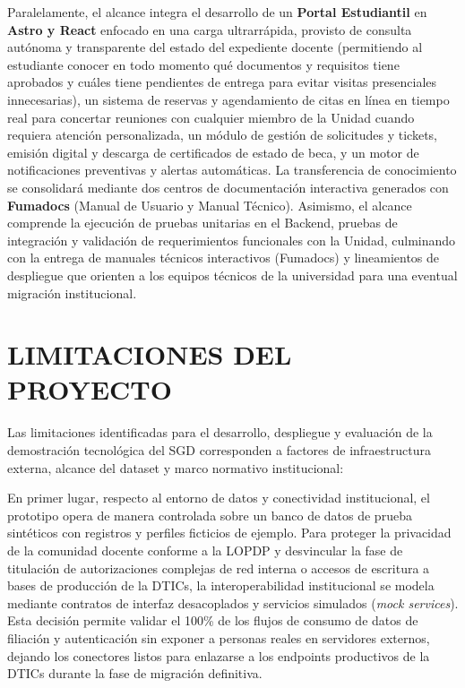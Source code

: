 Paralelamente, el alcance integra el desarrollo de un \textbf{Portal Estudiantil} en \textbf{Astro y React} enfocado en una carga ultrarrápida, provisto de consulta autónoma y transparente del estado del expediente docente (permitiendo al estudiante conocer en todo momento qué documentos y requisitos tiene aprobados y cuáles tiene pendientes de entrega para evitar visitas presenciales innecesarias), un sistema de reservas y agendamiento de citas en línea en tiempo real para concertar reuniones con cualquier miembro de la Unidad cuando requiera atención personalizada, un módulo de gestión de solicitudes y tickets, emisión digital y descarga de certificados de estado de beca, y un motor de notificaciones preventivas y alertas automáticas. La transferencia de conocimiento se consolidará mediante dos centros de documentación interactiva generados con \textbf{Fumadocs} (Manual de Usuario y Manual Técnico). Asimismo, el alcance comprende la ejecución de pruebas unitarias en el Backend, pruebas de integración y validación de requerimientos funcionales con la Unidad, culminando con la entrega de manuales técnicos interactivos (Fumadocs) y lineamientos de despliegue que orienten a los equipos técnicos de la universidad para una eventual migración institucional.

\section{LIMITACIONES DEL PROYECTO}

Las limitaciones identificadas para el desarrollo, despliegue y evaluación de la demostración tecnológica del SGD corresponden a factores de infraestructura externa, alcance del dataset y marco normativo institucional:

En primer lugar, respecto al entorno de datos y conectividad institucional, el prototipo opera de manera controlada sobre un banco de datos de prueba sintéticos con registros y perfiles ficticios de ejemplo. Para proteger la privacidad de la comunidad docente conforme a la LOPDP y desvincular la fase de titulación de autorizaciones complejas de red interna o accesos de escritura a bases de producción de la DTICs, la interoperabilidad institucional se modela mediante contratos de interfaz desacoplados y servicios simulados (\textit{mock services}). Esta decisión permite validar el 100\% de los flujos de consumo de datos de filiación y autenticación sin exponer a personas reales en servidores externos, dejando los conectores listos para enlazarse a los endpoints productivos de la DTICs durante la fase de migración definitiva.

